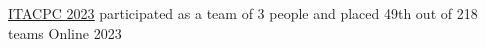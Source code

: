 

\begin{cvhonors}

  \cvhonor
    {\underline{\href{https://itacpc.it/competition/results/2023}{ITACPC 2023}}} %
    {participated as a team of 3 people and placed 49th out of 218 teams} %
    {Online} %
    {2023} %

\end{cvhonors}
